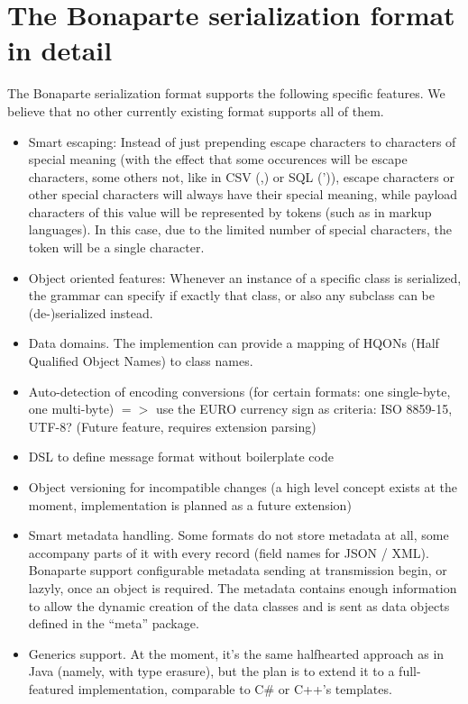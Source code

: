 \documentclass[11pt,a4paper,oneside]{article}
\begin{document}
\section{The Bonaparte serialization format in detail}
The Bonaparte serialization format supports the following specific features. We believe that no other
currently existing format supports all of them.
\begin{itemize}
    \item Smart escaping: Instead of just prepending escape characters to
    characters of special meaning (with the effect that some occurences will be escape characters, some others not, like in CSV (,) or SQL (')), escape characters or other special
    characters will always have their special meaning, while payload characters of this value will be represented by tokens
    (such as in markup languages). In this case, due to the limited number of special characters, the token will be a single
    character.
    \item Object oriented features: Whenever an instance of a specific class is
    serialized, the grammar can specify if exactly that class, or also any
    subclass can be (de-)serialized instead.
    \item Data domains. The implemention can provide a mapping of HQONs (Half
    Qualified Object Names) to class names. 
    \item Auto-detection of encoding conversions (for certain formats: one single-byte, one multi-byte) $=>$ use the EURO currency
    sign as criteria:
    ISO 8859-15, UTF-8? (Future feature, requires extension parsing)
    \item DSL to define message format without boilerplate code
    \item Object versioning for incompatible changes (a high level concept exists at the moment, implementation is planned as a future extension)
    \item Smart metadata handling. Some formats do not store metadata at all,
    some accompany parts of it with every record (field names for JSON / XML).
    Bonaparte support configurable metadata sending at transmission begin, or
    lazyly, once an object is required. The metadata contains enough information
    to allow the dynamic creation of the data classes and is sent as data
    objects defined in the ``meta'' package.
    \item Generics support. At the moment, it's the same halfhearted approach as in Java (namely, with type erasure), but the plan is to extend it to
    a full-featured implementation, comparable to C\# or C++'s templates. 
\end{itemize}
\end{document}
